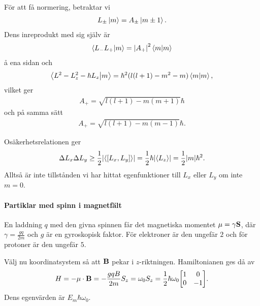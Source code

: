 För att få normering, betraktar vi
\begin{align*}
	L_{\pm}\ket{m} = A_{\pm}\ket{m\pm 1}.
\end{align*}
Dens inreprodukt med sig själv är
\begin{align*}
	\braket{L_{-}L_{+}}{m} = \abs{A_{+}}^{2}\braket{m}
\end{align*}
å ena sidan och
\begin{align*}
	\braket{L^{2} - L_{z}^{2} - \hbar L_{z}}{m} = \hbar^{2}(l(l + 1) - m^{2} - m)\braket{m},
\end{align*}
vilket ger
\begin{align*}
	A_{+} = \sqrt{l(l + 1)- m(m + 1)}\hbar
\end{align*}
och på samma sätt
\begin{align*}
	A_{+} = \sqrt{l(l + 1)- m(m - 1)}\hbar.
\end{align*}

Osäkerhetsrelationen ger
\begin{align*}
	\Delta L_{x}\Delta L_{y} \geq \frac{1}{2}\abs{\expval{[L_{x}, L_{y}]}} = \frac{1}{2}\hbar\abs{\expval{L_{z}}} = \frac{1}{2}\abs{m}\hbar^{2}.
\end{align*}
Alltså är inte tillstånden vi har hittat egenfunktioner till $L_{x}$ eller $L_{y}$ om inte $m = 0$.

\paragraph{Partiklar med spinn i magnetfält}
En laddning $q$ med den givna spinnen får det magnetiska momentet $\vb{\mu} = \gamma\vb{S}$, där $\gamma = \frac{gq}{2m}$ och $g$ är en gyroskopisk faktor. För elektroner är den ungefär $2$ och för protoner är den ungefär $5$.

Välj nu koordinatsystem så att $\vb{B}$ pekar i $z$-riktningen. Hamiltonianen ges då av
\begin{align*}
	H = -\vb{\mu}\cdot\vb{B} = -\frac{gqB}{2m}S_{z} = \omega_{0}S_{z} = \frac{1}{2}\hbar\omega_{0}
	\mqty[
		1 & 0 \\
		0 & -1
	].
\end{align*}
Dens egenvärden är $E_{m}\hbar\omega_{0}$.

